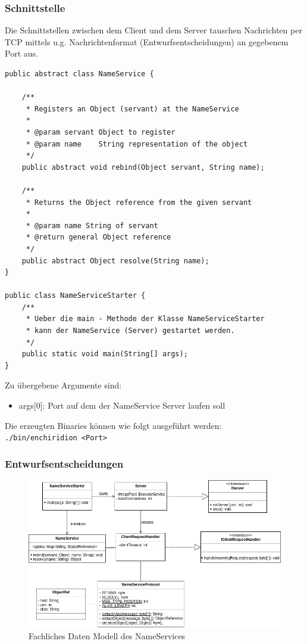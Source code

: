 \documentclass{article}
\begin{document}
\subsubsection{Schnittstelle}
Die Schnittstellen zwischen dem Client und dem Server tauschen Nachrichten per TCP mittels
u.g. Nachrichtenformat (Entwurfsentscheidungen) an gegebenem Port aus.
\begin{lstlisting}
public abstract class NameService {

    /**
     * Registers an Object (servant) at the NameService
     *
     * @param servant Object to register
     * @param name    String representation of the object
     */
    public abstract void rebind(Object servant, String name);

    /**
     * Returns the Object reference from the given servant
     *
     * @param name String of servant
     * @return general Object reference
     */
    public abstract Object resolve(String name);
}

public class NameServiceStarter {
    /**
     * Ueber die main - Methode der Klasse NameServiceStarter
     * kann der NameService (Server) gestartet werden.
     */
    public static void main(String[] args);
}
\end{lstlisting}
Zu übergebene Argumente sind:
\begin{itemize}
	\item args[0]: Port auf dem der NameService Server laufen soll
\end{itemize}

Die erzeugten Binaries können wie folgt ausgeführt werden:\\

\texttt{./bin/enchiridion <Port>}

\subsubsection{Entwurfsentscheidungen} \label{nameservice-entwurf}
\begin{figure}[H]
    \centering
    \includegraphics[width=\textwidth]{nameservice-fdm.png}
    \caption[fdm-nameservice]{Fachliches Daten Modell des NameServices}
    \label{fig:fdm-nameservice}
\end{figure}
\end{document}
